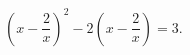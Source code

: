 \begin{ex}[type=equation]
	\begin{condition}
		$\left(x - \dfrac{2}{x}\right)^2 -2\left(x -  \dfrac{2}{x}\right) = 3.$
	\end{condition}
\end{ex}